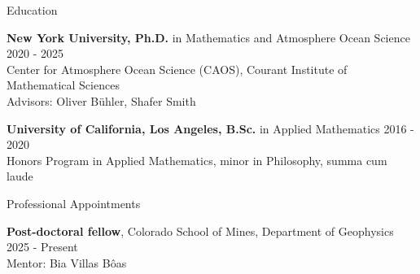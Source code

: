 \documentclass{resume} %
\begin{document}

\begin{rSection}{Education}

{\bf New York University, Ph.D.} in Mathematics and Atmosphere Ocean Science \hfill {2020 - 2025} \\
Center for Atmosphere Ocean Science (CAOS), Courant Institute of Mathematical Sciences\\
Advisors: Oliver B\"uhler, Shafer Smith

{\bf University of California, Los Angeles, B.Sc.} in Applied Mathematics \hfill {2016 - 2020} \\
Honors Program in Applied Mathematics, minor in Philosophy, summa cum laude


\end{rSection}


\begin{rSection}{Professional Appointments}

\textbf{Post-doctoral fellow}, Colorado School of Mines, Department of Geophysics \hfill {2025 - Present}\\
Mentor: Bia Villas Bôas

\end{rSection}
\end{document}
